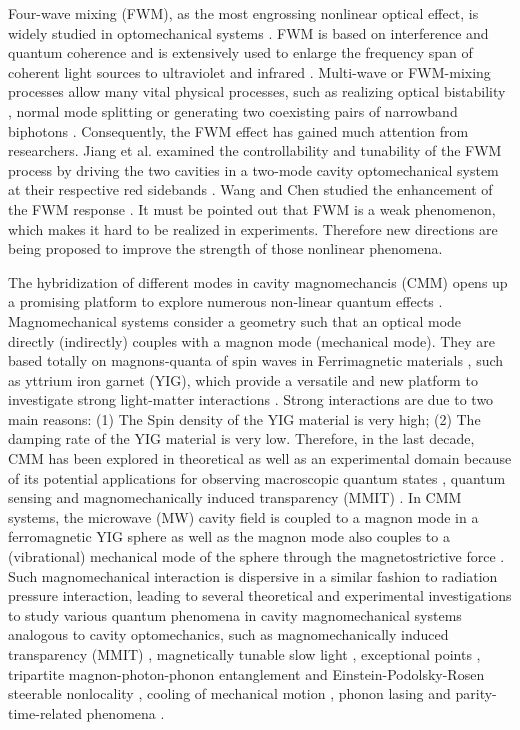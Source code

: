 \documentclass[aps,pra,superscriptaddress,balancelastpage,twocolumn]{revtex4}
\begin{document}
Four-wave mixing (FWM), as the most engrossing nonlinear optical effect, is widely studied in optomechanical systems \cite{FWM1}. FWM is based on interference and quantum coherence and is extensively used to enlarge the frequency span of coherent light sources to ultraviolet and infrared \cite{FWM2,AliM3}. Multi-wave or FWM-mixing processes allow many vital physical processes, such as realizing optical bistability \cite{FWM3}, normal mode splitting \cite{FWM4A} or generating two coexisting pairs of narrowband biphotons \cite{FWM5}. Consequently, the FWM effect has gained much attention from researchers. Jiang et al. examined the controllability and tunability of the FWM process by driving the two cavities in a two-mode cavity optomechanical system at their respective red sidebands \cite{FWM6}. Wang and Chen studied the enhancement of the FWM response \cite{FWM7}. It
must be pointed out that FWM is a weak phenomenon, which makes it hard to be realized in experiments. Therefore new directions are being proposed to improve the strength of those nonlinear phenomena.

The hybridization of different modes in cavity magnomechancis (CMM) opens up a promising platform to explore numerous non-linear quantum effects \cite{Tang}. Magnomechanical systems consider a geometry such that an optical mode directly (indirectly) couples with a magnon mode (mechanical mode).
They are based totally on magnons-quanta of spin waves in Ferrimagnetic materials \cite{Heyroth}, such as yttrium iron garnet (YIG), which provide a versatile and new platform to investigate strong light-matter interactions \cite{Gros}. Strong interactions are due to two main reasons: (1) The Spin density of the YIG material is very high; (2) The damping rate of the YIG
material is very low. Therefore, in the last decade, CMM has been explored in theoretical as well as an experimental domain because of its potential applications for observing macroscopic quantum states \cite{Jiee}, quantum sensing \cite{Usami} and magnomechanically induced transparency (MMIT) \cite{Kamran,AliM4,XLi}. In CMM systems, the microwave (MW) cavity field is coupled to a magnon mode in a ferromagnetic YIG sphere \cite{MYP} as well as the magnon mode also couples to a (vibrational) mechanical mode of the sphere through the magnetostrictive force \cite{Deng}. Such magnomechanical interaction is
dispersive \cite{Tang,Rome} in a similar fashion to radiation pressure interaction, leading to several theoretical and experimental investigations to study various quantum phenomena in cavity magnomechanical systems analogous to cavity optomechanics, such as magnomechanically induced transparency (MMIT) \cite{Tang,Kamran}, magnetically tunable slow light \cite%
{Cui,XLi}, exceptional points \cite{Den}, tripartite magnon-photon-phonon entanglement and Einstein-Podolsky-Rosen steerable nonlocality \cite{Tann}, cooling of mechanical motion \cite{Asjad}, phonon lasing \cite{Cong} and parity-time-related phenomena \cite{Annl}.
\end{document}
